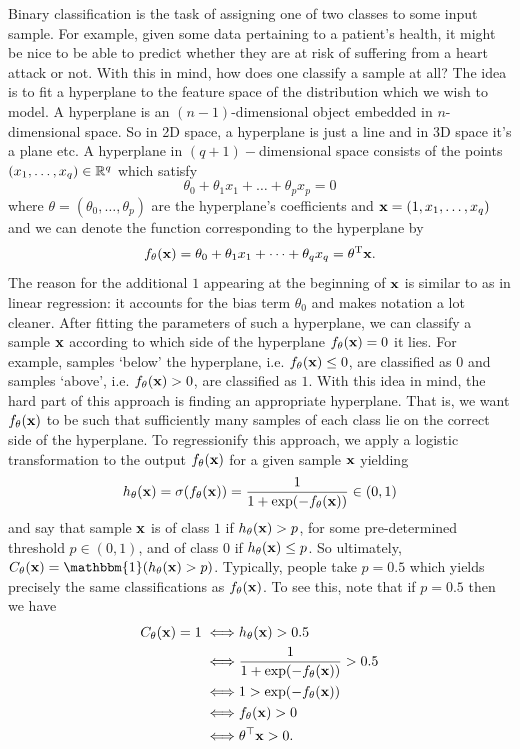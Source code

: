 \documentclass[11pt]{article}
\begin{document}
Binary classification is the task of assigning one of two classes to some input sample. For example, given some data pertaining to a patient's health, it might be nice to be able to predict whether they are at risk of suffering from a heart attack or not. With this in mind, how does one classify a sample at all? The idea is to fit a hyperplane to the feature space of the distribution which we wish to model. A hyperplane is an $(n-1)$-dimensional object embedded in $n$-dimensional space. So in 2D space, a hyperplane is just a line and in 3D space it's a plane etc. A hyperplane in $(q+1)-$dimensional space consists of the points $(x_1,\dots,x_q)\in\mathbb{R}^q$ which satisfy
$$
\theta_0+\theta_1x_1+\dots+\theta_px_p=0
$$
where $\theta=(\theta_0,\dots,\theta_p)$ are the hyperplane's coefficients and $\mathbf{x}=(1,x_1,\dots,x_q)$ and we can denote the function corresponding to the hyperplane by
$$
f_{\theta}(\mathbf{x})
=
\theta_0+\theta_1x_1+\dots+\theta_qx_q
=
\theta^{\text{T}}\mathbf{x}.
$$
The reason for the additional $1$ appearing at the beginning of $\mathbf{x}$ is similar to as in linear regression: it accounts for the bias term $\theta_0$ and makes notation a lot cleaner. After fitting the parameters of such a hyperplane, we can classify a sample $\mathbf{x}$ according to which side of the hyperplane $f_{\theta}(\mathbf{x})=0$ it lies. For example, samples `below' the hyperplane, i.e. $f_{\theta}(\mathbf{x})\leq0$, are classified as $0$ and samples `above', i.e. $f_{\theta}(\mathbf{x})>0$, are classified as $1$. With this idea in mind, the hard part of this approach is finding an appropriate hyperplane. That is, we want $f_{\theta}(\mathbf{x})$ to be such that sufficiently many samples of each class lie on the correct side of the hyperplane. To regressionify this approach, we apply a logistic transformation to the output $f_{\theta}(\mathbf{x})$ for a given sample $\mathbf{x}$ yielding
$$
h_{\theta}(\mathbf{x})
=
\sigma(f_{\theta}(\mathbf{x}))
=
\frac{1}{1+\exp(-f_{\theta}(\mathbf{x}))}\in(0,1)
$$
and say that sample $\mathbf{x}$ is of class $1$ if $h_{\theta}(\mathbf{x})>p$, for some pre-determined threshold $p\in(0,1)$, and of class $0$ if $h_{\theta}(\mathbf{x})\leq p$. So ultimately, $C_{\theta}(\x)=\mathbbm{1}(h_{\theta}(\x)>p)$. Typically, people take $p=0.5$ which yields precisely the same classifications as $f_{\theta}(\mathbf{x})$. To see this, note that if $p=0.5$ then we have
\begin{align*}
    C_{\theta}(\mathbf{x})=1
    \iff & h_{\theta}(\mathbf{x})>0.5\\
    \iff & \frac{1}{1+\exp(-f_{\theta}(\mathbf{x}))}>0.5\\
    \iff & 1 > \exp(-f_{\theta}(\mathbf{x}))\\
    \iff & f_{\theta}(\mathbf{x}) > 0\\
    \iff & \theta^{\top}\mathbf{x} > 0.
\end{align*}
\end{document}
